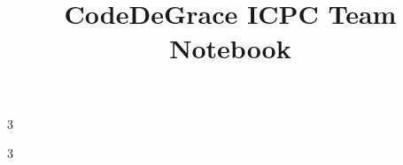 \documentclass[8pt]{extarticle}
\title{\vspace{-4ex}\Large{CodeDeGrace ICPC Team Notebook}}
\author{}
\date{}
\begin{document}
\pagestyle{fancy}
\setlength{\columnseprule}{0.4pt}
\setlength{\columnsep}{10pt}

\begin{multicols}{3}
\maketitle
\vspace{-13ex}
\tableofcontents
\end{multicols}

\clearpage

\setlength{\columnsep}{10pt}
\begin{multicols}{3}

\end{multicols}

% 
\end{document}
